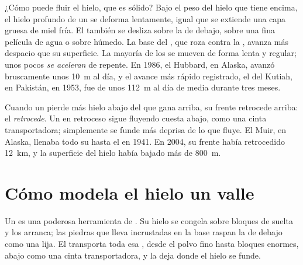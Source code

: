 ¿Cómo puede fluir el hielo, que es sólido? Bajo el peso del hielo que
tiene encima, el hielo profundo de un  se deforma lentamente, igual
que se extiende una capa gruesa de miel fría. El  también se
desliza sobre la  de debajo, sobre una fina película de agua o sobre
 húmedo. La base del , que roza contra la , avanza más
despacio que su superficie. La mayoría de los  se mueven de forma
lenta y regular; unos pocos \emph{se aceleran} de repente. En 1986, el
 Hubbard, en Alaska, avanzó bruscamente unos \qty{10}{m} al día, y
el avance más rápido registrado, el del  Kutiah, en Pakistán, en
1953, fue de unos \qty{112}{m} al día de media durante tres meses.

Cuando un  pierde más hielo abajo del que gana arriba, su frente
retrocede  arriba: el  \emph{retrocede}. Un  en
retroceso sigue fluyendo cuesta abajo, como una cinta transportadora;
simplemente se funde más deprisa de lo que fluye. El  Muir, en
Alaska, llenaba todo su  hasta el  en 1941. En 2004, su frente
había retrocedido \qty{12}{km}, y la superficie del hielo había bajado más
de \qty{800}{m}.

\section{Cómo modela el hielo un valle}

Un  es una poderosa herramienta de . Su hielo se congela
sobre bloques de  suelta y los arranca; las piedras que lleva
incrustadas en la base raspan la  de debajo como una lija. El 
transporta toda esa , desde el polvo fino hasta bloques enormes, 
abajo como una cinta transportadora, y la deja donde el hielo se funde.

